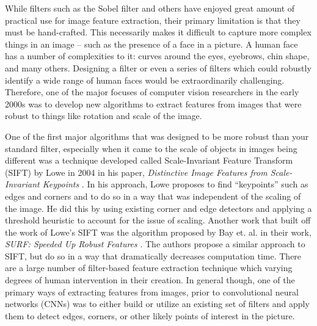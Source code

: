 \documentclass[../thesis.tex]{subfiles}
\begin{document}
While filters such as the Sobel filter and others have enjoyed great amount of
practical use for image feature extraction, their primary limitation is that
they must be hand-crafted. This necessarily makes it difficult to capture more
complex things in an image -- such as the presence of a face in a picture. A
human face has a number of complexities to it: curves around the eyes, eyebrows,
chin shape, and many others. Designing a filter or even a series of filters
which could robustly identify a wide range of human faces would be
extraordinarily challenging. Therefore, one of the major focuses of computer
vision researchers in the early 2000s was to develop new algorithms to extract
features from images that were robust to things like rotation and scale of the
image.

One of the first major algorithms that was designed to be more robust than your
standard filter, especially when it came to the scale of objects in images being
different was a technique developed called Scale-Invariant Feature Transform
(SIFT) by Lowe in 2004 in his paper, \textit{Distinctive Image Features from
Scale-Invariant Keypoints} \cite{lowe2004distinctive}. In his approach, Lowe
proposes to find ``keypoints'' such as edges and corners and to do so in a way
that was independent of the scaling of the image. He did this by using existing
corner and edge detectors and applying a threshold heuristic to account for the
issue of scaling. Another work that built off the work of Lowe's SIFT was the
algorithm proposed by Bay et. al. in their work, \textit{SURF: Speeded Up Robust
Features} \cite{bay2006surf}. The authors propose a similar approach to SIFT,
but do so in a way that dramatically decreases computation time. There are a
large number of filter-based feature extraction technique which varying degrees
of human intervention in their creation. In general though, one of the primary
ways of extracting features from images, prior to convolutional neural networks
(CNNs) was to either build or utilize an existing set of filters and apply them
to detect edges, corners, or other likely points of interest in the picture.
\end{document}
